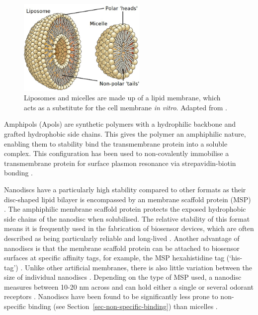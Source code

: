 \documentclass[
  a4paper,
]{scrbook}
\begin{document}
\begin{figure}

{\centering \includegraphics[width=0.55\textwidth,height=\textheight]{figures/ch3/OSC_Microbio_07_03_micelle_edit.png}

}

\caption{\label{fig-micelle}Liposomes and micelles are made up of a
lipid membrane, which acts as a substitute for the cell membrane
\emph{in vitro}. Adapted from \autocite{Micelle}.}

\end{figure}

Amphipols (Apols) are synthetic polymers with a hydrophilic backbone and
grafted hydrophobic side chains. This gives the polymer an amphiphilic
nature, enabling them to stability bind the transmembrane protein into a
soluble complex. This configuration has been used to non-covalently
immobilise a transmembrane protein for surface plasmon resonance via
strepavidin-biotin bonding \autocite{Fruh2011}.

Nanodiscs have a particularly high stability compared to other formats
as their disc-shaped lipid bilayer is encompassed by an membrane
scaffold protein (MSP) \autocite{Nath2007,Bayburt2010}. The amphiphilic
membrane scaffold protein protects the exposed hydrophobic side chains
of the nanodisc when solubilised\autocite{Fruh2011}. The relative
stability of this format means it is frequently used in the fabrication
of biosensor devices, which are often described as being particularly
reliable and long-lived
\autocite{Goldsmith2011,Yang2018,Moon2020,Cheema2021}. Another advantage
of nanodiscs is that the membrane scaffold protein can be attached to
biosensor surfaces at specific affinity tags, for example, the MSP
hexahistidine tag (`his-tag') \autocite{Bayburt2010,Fruh2011}. Unlike
other artificial membranes, there is also little variation between the
size of individual nanodiscs \autocite{Nath2007,Fruh2011}. Depending on
the type of MSP used, a nanodisc measures between 10-20 nm across and
can hold either a single or several odorant receptors
\autocite{Nath2007,Bayburt2010}. Nanodiscs have been found to be
significantly less prone to non-specific binding (see
Section~\ref{sec-non-specific-binding}) than micelles
\autocite{Fruh2011}.
\end{document}

